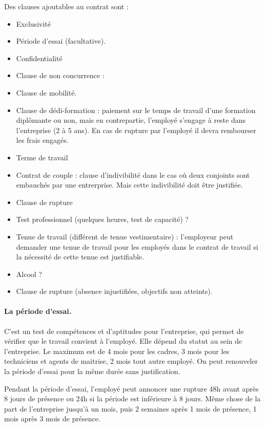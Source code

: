 	Des clauses ajoutables au contrat sont :
	\begin{itemize}
		\item[\textbullet] Exclusivité
		\item[\textbullet] Période d’essai (facultative).
		\item[\textbullet] Confidentialité
		\item[\textbullet] Clause de non concurrence : 
		\item[\textbullet] Clause de mobilité.
		\item[\textbullet] Clause de dédi-formation : paiement sur le temps de travail d’une formation diplômante ou non, mais en contrepartie, l’employé s’engage à reste dans l’entreprise (2 à 5 ans). En cas de rupture par l'employé il devra rembourser les frais engagés.
		\item[\textbullet] Terme de travail
		\item[\textbullet] Contrat de couple : clause d'indivibilité dans le cas où deux conjoints sont embauchés par une entrerprise. Mais cette indivibilité doit être justifiée.
		\item[\textbullet] Clause de rupture
		\item[\textbullet] Test professionnel (quelques heures, test de capacité) ?
		\item[\textbullet] Tenue de travail (différent de tenue vestimentaire) : l’employeur peut demander une tenue de travail pour les employés dans le contrat de travail si la nécessité de cette tenue est justifiable.
		\item[\textbullet] Alcool ?
		\item[\textbullet] Clause de rupture (absence injustifiées, objectifs non atteints).
	\end{itemize}
	
	\paragraph{La période d'essai.}
	C'est un test de compétences et d'aptitudes pour l'entreprise, qui permet de vérifier que le travail convient à l'employé.
	Elle dépend du statut au sein de l’entreprise. 
	Le maximum est de 4 mois pour les cadres, 3 mois pour les techniciens et agents de maitrise, 2 mois tout autre employé.
	On peut renouveler la période d’essai pour la même durée sans justification.
	
	Pendant la période d’essai, l’employé peut annoncer une rupture 48h avant après 8 jours de présence ou 24h si la période est inférieure à 8 jours.
	Même chose de la part de l'entreprise jusqu'à un mois, puis 2 semaines après 1 mois de présence, 1 mois après 3 mois de présence.
	
